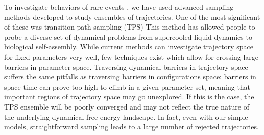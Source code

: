 \documentclass[11pt]{article}
\begin{document}

To investigate behaviors of rare events , we have used advanced sampling methods developed to study ensembles of trajectories. One of the most significant of these was transition path sampling (TPS) %
This method has allowed people to probe a diverse set of dynamical problems from supercooled liquid dynamics %
to biological self-assembly. %
While current methods can investigate trajectory space for fixed parameters very well, few techniques exist which allow for crossing large barriers in parameter space. Traversing dynamical barriers in trajectory space suffers the same pitfalls as traversing barriers in configurations space: barriers in space-time can prove too high to climb in a given parameter set, meaning that important regions of trajectory space may go unexplored.  If this is the case, the TPS ensemble will be poorly converged and may not reflect the true nature of the underlying dynamical free energy landscape. In fact, even with our simple models, straightforward sampling leads to a large number of rejected trajectories.

\end{document}
